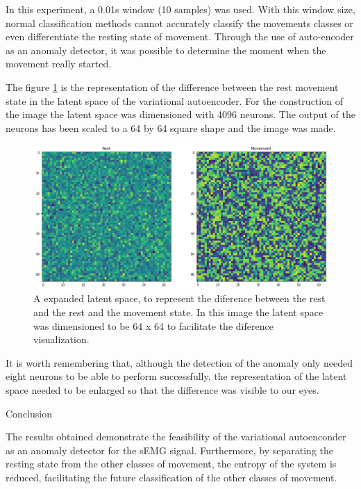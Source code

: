 \documentclass[a4paper, 12pt]{ppgeb}
\makeatletter
\renewcommand{\section}{\@startsection
{section}
{1}
{0mm}
{-\baselineskip}
{0.5\baselineskip}
{\large\bfseries\scshape}}
\makeatother
\begin{document}
In this experiment, a 0.01s window (10 samples) was used. With this window size, normal classification methods cannot accurately classify the movements classes or even differentiate the resting state of movement. Through the use of auto-encoder as an anomaly detector, it was possible to determine the moment when the movement really started.

The figure \ref{fig_lat_space_rep} is the representation of the difference between the rest movement state in the latent space of the variational autoencoder. For the construction of the image the latent space was dimensioned with 4096 neurons. The output of the neurons has been scaled to a 64 by 64 square shape and the image was made.

\begin{figure}[h]
    \begin{center}
	\includegraphics[width=.8\linewidth]{latent_space_as_image.png}
	\end{center}
	\caption{A expanded latent space, to represent the diference between the rest and the rest and the movement state. In this image the latent space was dimensioned to be 64 x 64 to facilitate the diference visualization.} \label{fig_lat_space_rep}
\end{figure}

It is worth remembering that, although the detection of the anomaly only needed eight neurons to be able to perform successfully, the representation of the latent space needed to be enlarged so that the difference was visible to our eyes.

\section{Conclusion}

The results obtained demonstrate the feasibility of the variational autoenconder as an anomaly detector for the \ac{sEMG} signal. Furthermore, by separating the resting state from the other classes of movement, the entropy of the system is reduced, facilitating the future classification of the other classes of movement.
\end{document}
